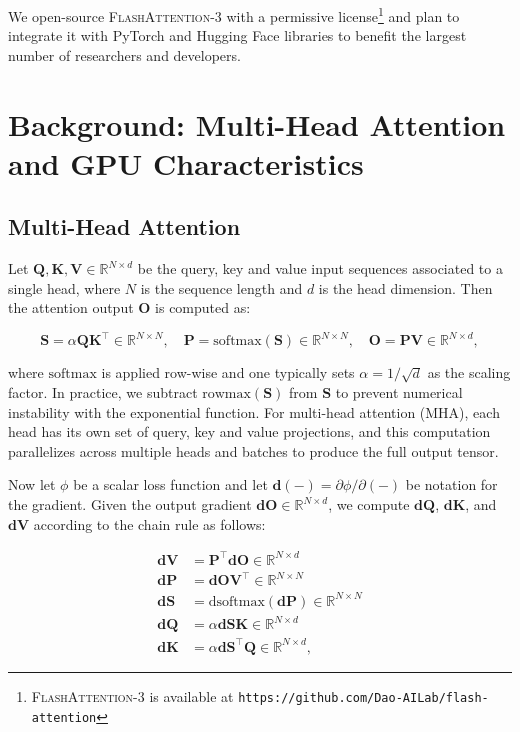We open-source \textsc{FlashAttention-3} with a permissive license\footnote{\textsc{FlashAttention-3}
  is available at \texttt{https://github.com/Dao-AILab/flash-attention}} and plan to integrate it with PyTorch and Hugging Face libraries to benefit the largest number of researchers and developers.

\section{Background: Multi-Head Attention and GPU Characteristics}
\label{sec:background}

\subsection{Multi-Head Attention}
\label{subsec:multi_head_attn}

Let $\mathbf{Q}, \mathbf{K}, \mathbf{V} \in \mathbb{R}^{N \times d}$ be the query, key and value input sequences associated to a single head, where $N$ is the sequence length and $d$ is the head dimension. Then the attention output $\mathbf{O}$ is computed as:

\begin{equation*}
  \mathbf{S} = \alpha \mathbf{Q} \mathbf{K}^\top \in \mathbb{R}^{N \times N}, \quad \mathbf{P} = \mathrm{softmax}(\mathbf{S}) \in \mathbb{R}^{N \times N}, \quad \mathbf{O} = \mathbf{P}\mathbf{V} \in \mathbb{R}^{N \times d},
\end{equation*}

where $\mathrm{softmax}$ is applied row-wise and one typically sets $\alpha = 1/\sqrt{d}$ as the scaling factor. In practice, we subtract $\mathrm{rowmax}(\mathbf{S})$ from $\mathbf{S}$ to prevent numerical instability with the exponential function. For multi-head attention (MHA), each head has its own set of query, key and value projections, and this computation parallelizes across multiple heads and batches to produce the full output tensor.

Now let $\phi$ be a scalar loss function and let $\mathbf{d}(-) = \partial \phi / \partial (-)$ be notation for the gradient. Given the output gradient $\mathbf{dO} \in \mathbb{R}^{N \times d}$, we compute $\mathbf{dQ}$, $\mathbf{dK}$, and $\mathbf{dV}$ according to the chain rule as follows:

\begin{align*}
  \mathbf{dV} &= \mathbf{P}^\top \mathbf{dO} \in \mathbb{R}^{N \times d} \\
  \mathbf{dP} &= \mathbf{dO} \mathbf{V}^\top \in \mathbb{R}^{N \times N} \\
  \mathbf{dS} &= \mathrm{dsoftmax} (\mathbf{dP}) \in \mathbb{R}^{N \times N} \\
  \mathbf{dQ} &= \alpha \mathbf{dS} \mathbf{K} \in \mathbb{R}^{N \times d} \\
  \mathbf{dK} &= \alpha \mathbf{dS}^\top \mathbf{Q} \in \mathbb{R}^{N \times d},
\end{align*}

